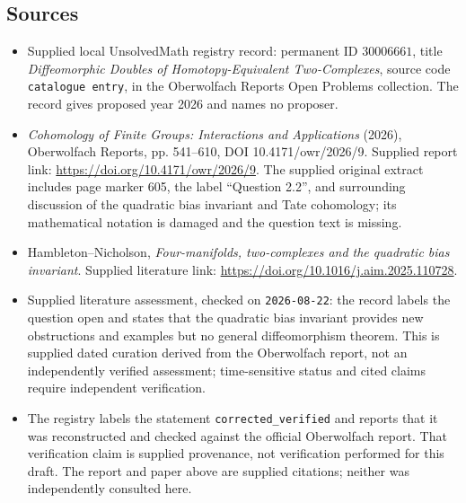 \documentclass[11pt]{article}
\begin{document}
\subsection{Sources}
\begin{itemize}
\item Supplied local UnsolvedMath registry record: permanent ID \(30006661\), title \emph{Diffeomorphic Doubles of Homotopy-Equivalent Two-Complexes}, source code \texttt{catalogue entry}, in the Oberwolfach Reports Open Problems collection. The record gives proposed year 2026 and names no proposer.
\item \emph{Cohomology of Finite Groups: Interactions and Applications} (2026), Oberwolfach Reports, pp. 541--610, DOI 10.4171/owr/2026/9. Supplied report link: \url{https://doi.org/10.4171/owr/2026/9}. The supplied original extract includes page marker 605, the label ``Question 2.2'', and surrounding discussion of the quadratic bias invariant and Tate cohomology; its mathematical notation is damaged and the question text is missing.
\item Hambleton--Nicholson, \emph{Four-manifolds, two-complexes and the quadratic bias invariant}. Supplied literature link: \url{https://doi.org/10.1016/j.aim.2025.110728}.
\item Supplied literature assessment, checked on \texttt{2026-08-22}: the record labels the question open and states that the quadratic bias invariant provides new obstructions and examples but no general diffeomorphism theorem. This is supplied dated curation derived from the Oberwolfach report, not an independently verified assessment; time-sensitive status and cited claims require independent verification.
\item The registry labels the statement \texttt{corrected\_verified} and reports that it was reconstructed and checked against the official Oberwolfach report. That verification claim is supplied provenance, not verification performed for this draft. The report and paper above are supplied citations; neither was independently consulted here.
\end{itemize}
\end{document}
